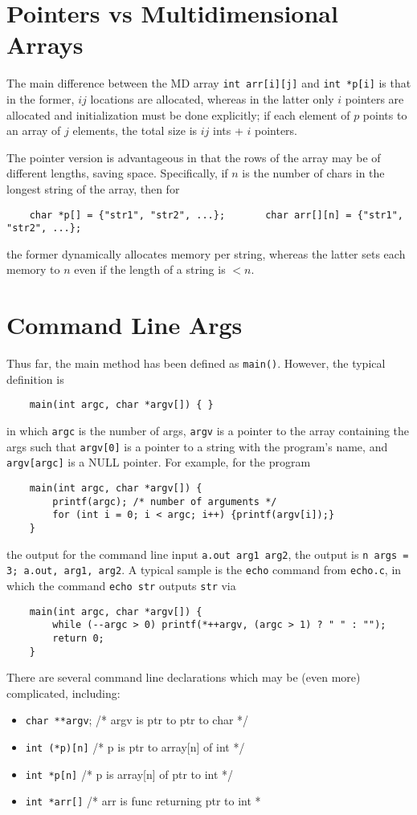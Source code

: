 \documentclass{tufte-book}
\begin{document}
\begin{fullwidth}
\section{Pointers vs Multidimensional Arrays}
The main difference between the MD array \lstinline{int arr[i][j]} and \lstinline{int *p[i]} is that in the former, $ij$ locations are allocated, whereas in the latter only $i$ pointers are allocated and initialization must be done explicitly; if each element of $p$ points to an array of $j$ elements, the total size is $ij$ ints + $i$ pointers.

\bigskip
The pointer version is advantageous in that the rows of the array may be of different lengths, saving space. Specifically, if $n$ is the number of chars in the longest string of the array, then for
\begin{lstlisting}
    char *p[] = {"str1", "str2", ...};       char arr[][n] = {"str1", "str2", ...};
\end{lstlisting}
the former dynamically allocates memory per string, whereas the latter sets each memory to $n$ even if the length of a string is $< n$.

\section{Command Line Args}
Thus far, the main method has been defined as \lstinline{main()}. However, the typical definition is
\begin{lstlisting}
    main(int argc, char *argv[]) { }
\end{lstlisting}
in which \lstinline{argc} is the number of args, \lstinline{argv} is a pointer to the array containing the args such that \lstinline{argv[0]} is a pointer to a string with the program's name, and \lstinline{argv[argc]} is a NULL pointer. For example, for the program
\begin{lstlisting}
    main(int argc, char *argv[]) {
        printf(argc); /* number of arguments */
        for (int i = 0; i < argc; i++) {printf(argv[i]);}
    }
\end{lstlisting}
the output for the command line input \lstinline{a.out arg1 arg2}, the output is \lstinline{n args = 3; a.out, arg1, arg2}. A typical sample is the \lstinline{echo} command from \lstinline{echo.c}, in which the command \lstinline{echo str} outputs \lstinline{str} via
\begin{lstlisting}
    main(int argc, char *argv[]) {
        while (--argc > 0) printf(*++argv, (argc > 1) ? " " : "");
        return 0;
    }
\end{lstlisting}
There are several command line declarations which may be (even more) complicated, including:
\begin{itemize}
    \item \lstinline{char **argv}; /* argv is ptr to ptr to char */
    \item \lstinline{int (*p)[n]} /* p is ptr to array[n] of int */
    \item \lstinline{int *p[n]} /* p is array[n] of ptr to int */
    \item \lstinline{int *arr[]} /* arr is func returning ptr to int *
\end{itemize}


\end{fullwidth}
\end{document}
